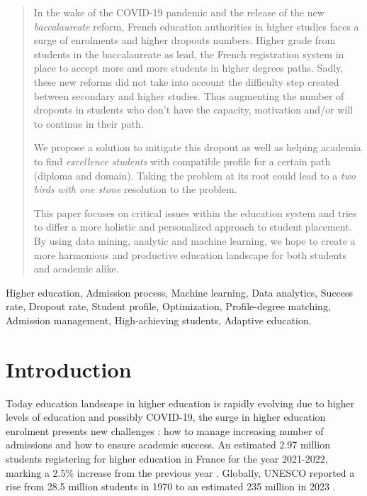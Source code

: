 \documentclass[conference]{IEEEtran}
\begin{document}
\begin{abstract}
In the wake of the COVID-19 pandemic and the release of the new \textit{baccalaureate} reform, French education authorities in higher studies faces a surge of enrolments and higher dropouts numbers. Higher grade from students in the baccalaureate as lead, the French registration system in place to accept more and more students in higher degrees paths. Sadly, these new reforms did not take into account the difficulty step created between secondary and higher studies. Thus augmenting the number of dropouts in students who don't have the capacity, motivation and/or will to continue in their path. 

We propose a solution to mitigate this dropout as well as helping academia to find \textit{excellence students} with compatible profile for a certain path (diploma and domain). Taking the problem at its root could lead to a \textit{two birds with one stone} resolution to the problem.

This paper focuses on critical issues within the education system and tries to differ a more holistic and personalized approach to student placement. By using data mining, analytic and machine learning, we hope to create a more harmonious and productive education landscape for both students and academic alike.
\end{abstract}
\vspace{8pt}
\begin{IEEEkeywords}
Higher education, Admission process, Machine learning, Data analytics, Success rate, Dropout rate, Student profile, Optimization, Profile-degree matching, Admission management, High-achieving students, Adaptive education.
\end{IEEEkeywords}
\vspace{16pt}

\section{Introduction}
Today education landscape in higher education is rapidly evolving due to higher levels of education and possibly COVID-19, the surge in higher education enrolment presents new challenges : how to manage increasing number of admissions and how to ensure academic success. 
An estimated 2.97 million students registering for higher education in France for the year 2021-2022, marking a 2.5\% increase from the previous year \cite{sous-direction_des_systemes_dinformation_et_des_etudes_statistiques_sies_les_2022}. Globally, UNESCO reported a rise from 28.5 million students in 1970 to an estimated 235 million in 2023 \cite{unesco_higher_2023}.
\end{document}
